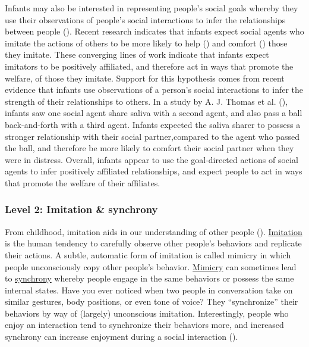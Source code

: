 \documentclass[
]{krantz}
\begin{document}
Infants may also be interested in representing people's social goals whereby they use their observations of people's social interactions to infer the relationships between people (). Recent research indicates that infants expect social agents who imitate the actions of others to be more likely to help () and comfort () those they imitate. These converging lines of work indicate that infants expect imitators to be positively affiliated, and therefore act in ways that promote the welfare, of those they imitate. Support for this hypothesis comes from recent evidence that infants use observations of a person's social interactions to infer the strength of their relationships to others. In a study by A. J. Thomas et al. (), infants saw one social agent share saliva with a second agent, and also pass a ball back-and-forth with a third agent. Infants expected the saliva sharer to possess a stronger relationship with their social partner,compared to the agent who passed the ball, and therefore be more likely to comfort their social partner when they were in distress. Overall, infants appear to use the goal-directed actions of social agents to infer positively affiliated relationships, and expect people to act in ways that promote the welfare of their affiliates.

\subsubsection*{Level 2: Imitation \& synchrony}\label{level-2-imitation-synchrony}


From childhood, imitation aids in our understanding of other people (). \hyperref[imitation]{Imitation} is the human tendency to carefully observe other people's behaviors and replicate their actions. A subtle, automatic form of imitation is called mimicry in which people unconsciously copy other people's behavior. \hyperref[mimicry]{Mimicry} can sometimes lead to \hyperref[synchrony]{synchrony} whereby people engage in the same behaviors or possess the same internal states. Have you ever noticed when two people in conversation take on similar gestures, body positions, or even tone of voice? They ``synchronize'' their behaviors by way of (largely) unconscious imitation. Interestingly, people who enjoy an interaction tend to synchronize their behaviors more, and increased synchrony can increase enjoyment during a social interaction ().
\end{document}
